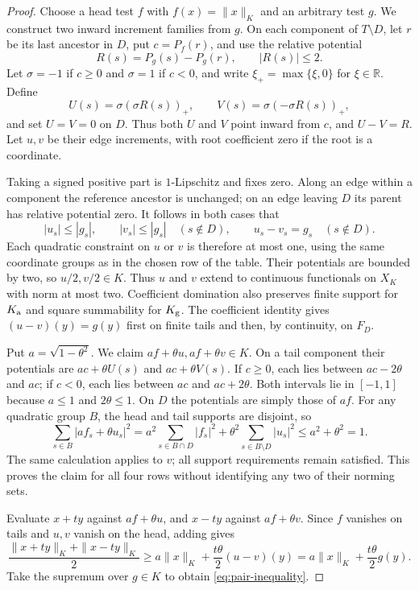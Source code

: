 \begin{proof}
Choose a head test $f$ with $f(x)=\|x\|_K$ and an arbitrary test $g$.
We construct two inward increment families from $g$. On each component of $T\setminus D$,
let $r$ be its last ancestor in $D$, put $c=P_f(r)$, and use the relative
potential
\[
 R(s)=P_g(s)-P_g(r),\qquad |R(s)|\le2.
\]
Let $\sigma=-1$ if $c\ge0$ and $\sigma=1$ if $c<0$, and write
$\xi_+=\max\{\xi,0\}$ for $\xi\in\mathbb R$. Define
\[
 U(s)=\sigma(\sigma R(s))_+,
 \qquad V(s)=\sigma(-\sigma R(s))_+,
\]
and set $U=V=0$ on $D$. Thus both $U$ and $V$ point inward from $c$,
and $U-V=R$. Let $u,v$ be their edge increments, with root
coefficient zero if the root is a coordinate.

Taking a signed positive part is $1$-Lipschitz and fixes zero. Along
an edge within a component the reference ancestor is unchanged; on
an edge leaving $D$ its parent has relative potential zero. It follows
in both cases that
\[
 |u_s|\le|g_s|,\qquad |v_s|\le|g_s|\quad(s\notin D),
 \qquad u_s-v_s=g_s\quad(s\notin D).
\]
Each quadratic constraint on $u$ or $v$ is therefore at most one,
using the same coordinate groups as in the chosen row of the table.
Their potentials are bounded by two, so $u/2,v/2\in K$. Thus $u$ and
$v$ extend to continuous functionals on $X_K$ with norm at most two.
Coefficient domination also preserves finite support for $K_{\rm a}$
and square summability for $K_{\rm g}$. The coefficient identity gives
$(u-v)(y)=g(y)$ first on finite tails and then, by continuity, on $F_D$.

Put $a=\sqrt{1-\theta^2}$. We claim $af+\theta u,af+\theta v\in K$.
On a tail component their potentials are $ac+\theta U(s)$ and
$ac+\theta V(s)$. If $c\ge0$, each lies between $ac-2\theta$ and $ac$;
if $c<0$, each lies between $ac$ and $ac+2\theta$. Both intervals lie
in $[-1,1]$ because $a\le1$ and $2\theta\le1$. On $D$ the potentials
are simply those of $af$. For any quadratic group $B$, the head and
tail supports are disjoint, so
\[
 \sum_{s\in B}|af_s+\theta u_s|^2
 =a^2\sum_{s\in B\cap D}|f_s|^2
   +\theta^2\sum_{s\in B\setminus D}|u_s|^2
 \le a^2+\theta^2=1.
\]
The same calculation applies to $v$; all support requirements remain
satisfied. This proves the claim for all four rows without identifying
any two of their norming sets.

Evaluate $x+ty$ against $af+\theta u$, and $x-ty$ against
$af+\theta v$. Since $f$ vanishes on tails and $u,v$ vanish on the head,
adding gives
\[
 \frac{\|x+ty\|_K+\|x-ty\|_K}{2}
 \ge a\|x\|_K+\frac{t\theta}{2}(u-v)(y)
 =a\|x\|_K+\frac{t\theta}{2}g(y).
\]
Take the supremum over $g\in K$ to obtain
\eqref{eq:pair-inequality}.
\end{proof}

